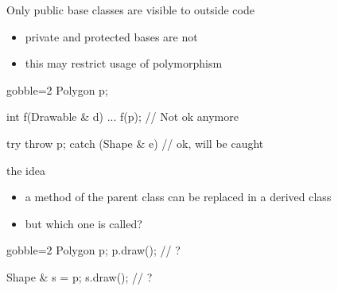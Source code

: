 \begin{frame}[fragile]
  \begin{block}{Only public base classes are visible to outside code}
    \begin{itemize}
    \item private and protected bases are not
    \item this may restrict usage of polymorphism
    \end{itemize}
  \end{block}
  \begin{multicols}{2}
    \begin{cppcode*}{gobble=2}
      Polygon p;

      int f(Drawable & d) {...}
      f(p);  // Not ok anymore

      try {
        throw p;
      } catch (Shape & e) {
        // ok, will be caught
      }
    \end{cppcode*}
    \columnbreak
    \center
  \end{multicols}
\end{frame}

\begin{frame}[fragile]
  \begin{block}{the idea}
    \begin{itemize}
    \item a method of the parent class can be replaced in a derived class
    \item but which one is called?
    \end{itemize}
  \end{block}
  \begin{multicols}{2}
    \begin{cppcode*}{gobble=2}
      Polygon p;
      p.draw(); // ?

      Shape & s = p;
      s.draw(); // ?
    \end{cppcode*}
    \columnbreak
    \center
  \end{multicols}
\end{frame}

